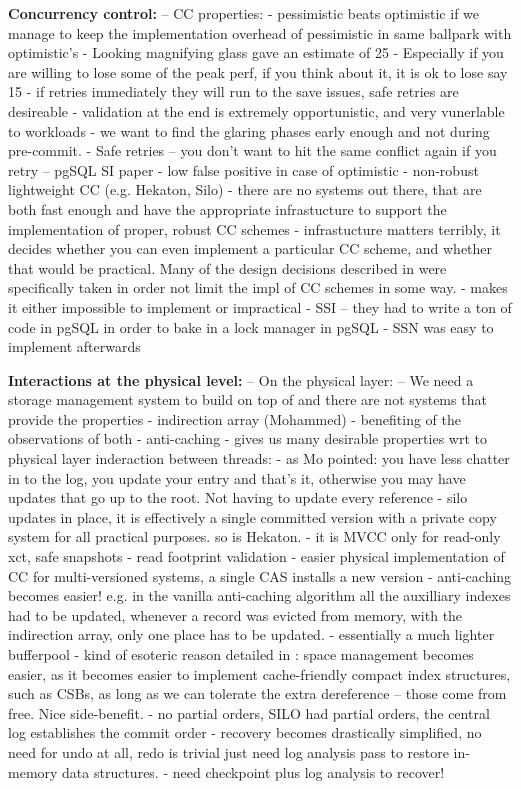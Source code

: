 {\bf Concurrency control:} 
-- CC properties:
- pessimistic beats optimistic if we manage to keep the implementation overhead of pessimistic in same ballpark with optimistic's
  - Looking magnifying glass gave an estimate of 25%
  - Especially if you are willing to lose some of the peak perf, if you think about it, it is ok to lose say 15%
- if retries immediately they will run to the save issues, safe retries are desireable 
  - validation at the end is extremely opportunistic, and very vunerlable to workloads
  - we want to find the glaring phases early enough and not during pre-commit.
- Safe retries -- you don't want to hit the same conflict again if you retry -- pgSQL SI paper 
  - low false positive in case of optimistic
  - non-robust lightweight CC (e.g. Hekaton, Silo)
- there are no systems out there, that are both fast enough and have the appropriate infrastucture to support the implementation of proper, robust CC schemes 
  - infrastucture matters terribly, it decides whether you can even implement a particular CC scheme, and whether that would be practical. Many of the design decisions described in  were specifically taken in order not limit the impl of CC schemes in some way.
    - makes it either impossible to implement or impractical
  - SSI -- they had to write a ton of code in pgSQL in order to bake in a lock manager in pgSQL
    - SSN was easy to implement afterwards 

{\bf Interactions at the physical level:} 
-- On the physical layer:
-- We need a storage management system to build on top of and there are not systems that provide the properties
- indirection array (Mohammed) 
  - benefiting of the observations of both
  - anti-caching
  - gives us many desirable properties wrt to physical layer inderaction between threads:
  - as Mo pointed: you have less chatter in to the log, you update your entry and that's it, otherwise you may have updates that go up to the root. Not having to update every reference
    - silo updates in place, it is effectively a single committed version with a private copy system for all practical purposes. so is Hekaton.
    - it is MVCC only for read-only xct, safe snapshots
    - read footprint validation
  - easier physical implementation of CC for multi-versioned systems, a single CAS installs a new version
  - anti-caching becomes easier! e.g. in the vanilla anti-caching algorithm all the auxilliary indexes had to be updated, whenever a record was evicted from memory, with the indirection array, only one place has to be updated.
    - essentially a much lighter bufferpool
  - kind of esoteric reason detailed in : space management becomes easier, as it becomes easier to implement cache-friendly compact index structures, such as CSBs, as long as we can tolerate the extra dereference -- those come from free. Nice side-benefit.
- no partial orders, SILO had partial orders, the central log establishes the commit order
  - recovery becomes drastically simplified, no need for undo at all, redo is trivial just need log analysis pass to restore in-memory data structures.
  - need checkpoint plus log analysis to recover!

